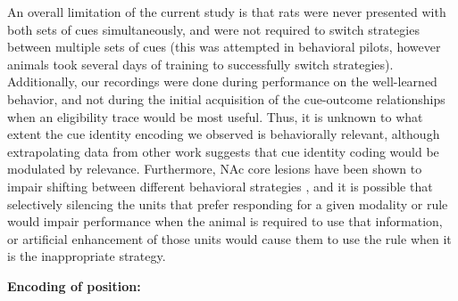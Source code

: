 \documentclass[11pt]{article}
\let\cite=\citep
\providecommand{\DIFadd}[1]{{\protect\color{red} \sf #1}} %
\providecommand{\DIFdel}[1]{} %
\providecommand{\DIFaddbegin}{} %
\providecommand{\DIFaddend}{} %
\providecommand{\DIFdelbegin}{} %
\providecommand{\DIFdelend}{} %
\newcommand{\DIFscaledelfig}{0.5}
\newlength{\DIFdelgraphicswidth} %
\newlength{\DIFdelgraphicsheight} %
\newcommand{\DIFaddincludegraphics}[2][]{{\color{red}\fbox{\DIFOincludegraphics[#1]{#2}}}} %
\newcommand{\DIFdelincludegraphics}[2][]{%
\sbox{\DIFdelgraphicsbox}{\DIFOincludegraphics[#1]{#2}}%
\settoboxwidth{\DIFdelgraphicswidth}{\DIFdelgraphicsbox} %
\settoboxtotalheight{\DIFdelgraphicsheight}{\DIFdelgraphicsbox} %
\scalebox{\DIFscaledelfig}{%
\parbox[b]{\DIFdelgraphicswidth}{\usebox{\DIFdelgraphicsbox}\\[-\baselineskip] \rule{\DIFdelgraphicswidth}{0em}}\llap{\resizebox{\DIFdelgraphicswidth}{\DIFdelgraphicsheight}{%
\setlength{\unitlength}{\DIFdelgraphicswidth}%
\begin{picture}(1,1)%
\thicklines\linethickness{2pt} %
{\color[rgb]{1,0,0}\put(0,0){\framebox(1,1){}}}%
{\color[rgb]{1,0,0}\put(0,0){\line( 1,1){1}}}%
{\color[rgb]{1,0,0}\put(0,1){\line(1,-1){1}}}%
\end{picture}%
}\hspace*{3pt}}} %
} %
\DeclareRobustCommand{\DIFaddbegin}{\DIFOaddbegin \let\includegraphics\DIFaddincludegraphics} %
\DeclareRobustCommand{\DIFaddend}{\DIFOaddend \let\includegraphics\DIFOincludegraphics} %
\DeclareRobustCommand{\DIFdelbegin}{\DIFOdelbegin \let\includegraphics\DIFdelincludegraphics} %
\DeclareRobustCommand{\DIFdelend}{\DIFOaddend \let\includegraphics\DIFOincludegraphics} %
\begin{document}
An overall limitation of the current study is that rats were never presented with both sets of cues simultaneously, and were not required to switch strategies between multiple sets of cues \DIFdelbegin \DIFdel{. }\DIFdelend \DIFaddbegin \DIFadd{(this was attempted in behavioral pilots, however animals took several days of training to successfully switch strategies). Additionally, our recordings were done during performance on the well-learned behavior, and not during the initial acquisition of the cue-outcome relationships when an eligibility trace would be most useful. }\DIFaddend Thus, it is unknown to what extent the cue identity encoding we observed is behaviorally relevant, although extrapolating data from other work \cite{Sleezer2016} suggests that cue identity coding would be modulated by relevance. \DIFaddbegin \DIFadd{Furthermore, }\DIFaddend NAc core lesions have been shown to impair shifting between different behavioral strategies \cite{Floresco2006a}, and it is possible that selectively silencing the units that prefer responding for a given modality or rule would impair performance when the animal is required to use that information, or artificial enhancement of those units would cause them to use the rule when it is the inappropriate strategy.

{\bf Encoding of position:}
\end{document}

